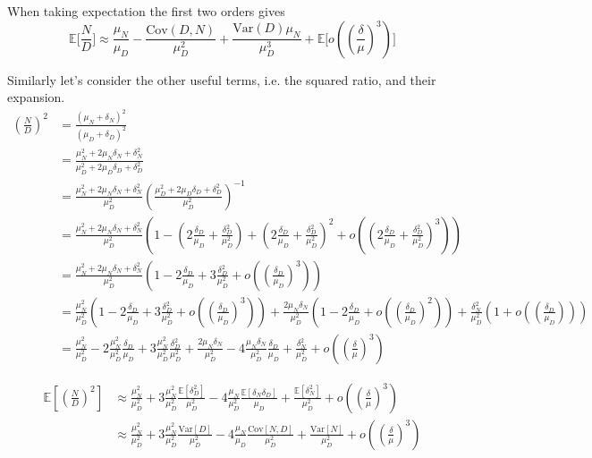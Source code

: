 When taking expectation the first two orders gives
\[
\mathbb{E}\big[\frac{N}{D}\big]\approx\frac{\mu_{N}}{\mu_{D}}-\frac{\mathrm{Cov}(D,N)}{\mu_{D}^{2}}+\frac{\mathrm{Var}(D)\mu_{N}}{\mu_{D}^{3}}+\mathbb{E}\big[o((\frac{\delta}{\mu})^{3})\big]
\]

Similarly let's consider the other useful terms, i.e. the squared
ratio, and their expansion.
\begin{align*}
(\frac{N}{D})^{2} & =\frac{(\mu_{N}+\delta_{N})^{2}}{(\mu_{D}+\delta_{D})^{2}}\\
 & =\frac{\mu_{N}^{2}+2\mu_{N}\delta_{N}+\delta_{N}^{2}}{\mu_{D}^{2}+2\mu_{D}\delta_{D}+\delta_{D}^{2}}\\
 & =\frac{\mu_{N}^{2}+2\mu_{N}\delta_{N}+\delta_{N}^{2}}{\mu_{D}^{2}}(\frac{\mu_{D}^{2}+2\mu_{D}\delta_{D}+\delta_{D}^{2}}{\mu_{D}^{2}})^{-1}\\
 & =\frac{\mu_{N}^{2}+2\mu_{N}\delta_{N}+\delta_{N}^{2}}{\mu_{D}^{2}}(1-(2\frac{\delta_{D}}{\mu_{D}}+\frac{\delta_{D}^{2}}{\mu_{D}^{2}})+(2\frac{\delta_{D}}{\mu_{D}}+\frac{\delta_{D}^{2}}{\mu_{D}^{2}})^{2}+o((2\frac{\delta_{D}}{\mu_{D}}+\frac{\delta_{D}^{2}}{\mu_{D}^{2}})^{3}))\\
 & =\frac{\mu_{N}^{2}+2\mu_{N}\delta_{N}+\delta_{N}^{2}}{\mu_{D}^{2}}(1-2\frac{\delta_{D}}{\mu_{D}}+3\frac{\delta_{D}^{2}}{\mu_{D}^{2}}+o((\frac{\delta_{D}}{\mu_{D}})^{3}))\\
 & =\frac{\mu_{N}^{2}}{\mu_{D}^{2}}(1-2\frac{\delta_{D}}{\mu_{D}}+3\frac{\delta_{D}^{2}}{\mu_{D}^{2}}+o((\frac{\delta_{D}}{\mu_{D}})^{3}))+\frac{2\mu_{N}\delta_{N}}{\mu_{D}^{2}}(1-2\frac{\delta_{D}}{\mu_{D}}+o((\frac{\delta_{D}}{\mu_{D}})^{2}))+\frac{\delta_{N}^{2}}{\mu_{D}^{2}}(1+o((\frac{\delta_{D}}{\mu_{D}})))\\
 & =\frac{\mu_{N}^{2}}{\mu_{D}^{2}}-2\frac{\mu_{N}^{2}}{\mu_{D}^{2}}\frac{\delta_{D}}{\mu_{D}}+3\frac{\mu_{N}^{2}}{\mu_{D}^{2}}\frac{\delta_{D}^{2}}{\mu_{D}^{2}}+\frac{2\mu_{N}\delta_{N}}{\mu_{D}^{2}}-4\frac{\mu_{N}\delta_{N}}{\mu_{D}^{2}}\frac{\delta_{D}}{\mu_{D}}+\frac{\delta_{N}^{2}}{\mu_{D}^{2}}+o((\frac{\delta}{\mu})^{3})
\end{align*}

\begin{align*}
\mathbb{E}[(\frac{N}{D})^{2}] & \approx\frac{\mu_{N}^{2}}{\mu_{D}^{2}}+3\frac{\mu_{N}^{2}}{\mu_{D}^{2}}\frac{\mathbb{E}[\delta_{D}^{2}]}{\mu_{D}^{2}}-4\frac{\mu_{N}}{\mu_{D}^{2}}\frac{\mathbb{E}[\delta_{N}\delta_{D}]}{\mu_{D}}+\frac{\mathbb{E}[\delta_{N}^{2}]}{\mu_{D}^{2}}+o((\frac{\delta}{\mu})^{3})\\
 & \approx\frac{\mu_{N}^{2}}{\mu_{D}^{2}}+3\frac{\mu_{N}^{2}}{\mu_{D}^{2}}\frac{\mathrm{Var}[D]}{\mu_{D}^{2}}-4\frac{\mu_{N}}{\mu_{D}}\frac{\mathrm{Cov}[N,D]}{\mu_{D}^{2}}+\frac{\mathrm{Var}[N]}{\mu_{D}^{2}}+o((\frac{\delta}{\mu})^{3})
\end{align*}

